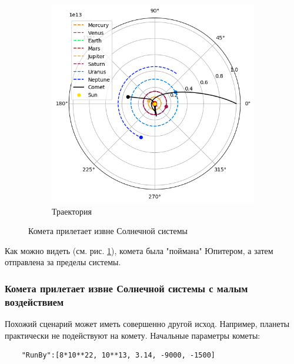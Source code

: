 \begin{figure}[H]
\begin{subfigure}{0.49\linewidth}
		\includegraphics[width=1\linewidth]{imgs_8/trjOutside.png}
		\caption{Траектория}
    \end{subfigure}
    \caption{Комета прилетает извне Солнечной системы}
    \label{fig:Outside}
\end{figure}

Как можно видеть (см. рис. \ref{fig:Outside}), комета была "поймана" Юпитером, а затем отправлена за пределы системы.

\subsubsection*{Комета прилетает извне Солнечной системы с малым воздействием}
Похожий сценарий может иметь совершенно другой исход.
Например, планеты практически не подействуют на комету. Начальные параметры кометы:
\begin{lstlisting}
	"RunBy":[8*10**22, 10**13, 3.14, -9000, -1500]
\end{lstlisting}

